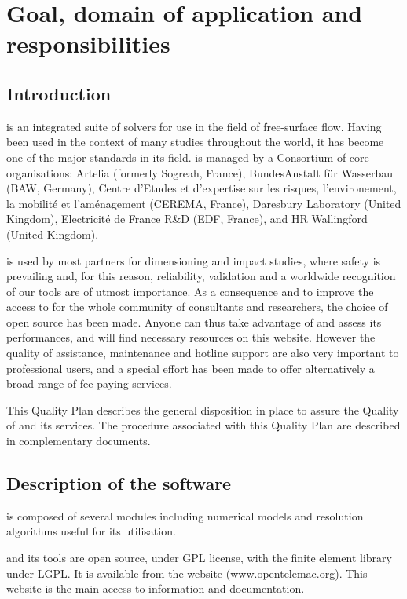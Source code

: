 \chapter{Goal, domain of application and responsibilities}

\section{Introduction}

\telemacsystem is an integrated suite of solvers for use in the field of free-surface
flow. Having been used in the context of many studies throughout the world, it
has become one of the major standards in its field.  \telemacsystem is managed by a
Consortium of core organisations: Artelia (formerly Sogreah, France),
BundesAnstalt für Wasserbau (BAW, Germany), Centre d’Etudes et d'expertise sur
les risques, l'environement, la mobilité et l'aménagement (CEREMA, France),
Daresbury Laboratory (United Kingdom), Electricité de France R\&D (EDF,
France), and HR Wallingford (United Kingdom).

\telemacsystem is used by most partners for dimensioning and impact studies,
where safety is prevailing and, for this reason, reliability, validation and a
worldwide recognition of our tools are of utmost importance. As a consequence
and to improve the access to \telemacsystem for the whole community of
consultants and researchers, the choice of open source has been made. Anyone
can thus take advantage of \telemacsystem and assess its performances, and
will find necessary resources on this website. However the quality of
assistance, maintenance and hotline support are also very important to
professional users, and a special effort has been made to offer alternatively a
broad range of fee-paying services.

This Quality Plan describes the general disposition in place to assure the
Quality of \telemacsystem and its services. The procedure associated with this Quality
Plan are described in complementary documents.

\section{Description of the software}

\telemacsystem is composed of several modules including numerical models and resolution
algorithms useful for its utilisation.

\telemacsystem and its tools are open source, under GPL license, with the \bief finite
element library under LGPL. It is available from the \telemacsystem website
(\url{www.opentelemac.org}). This website is the main access to \telemacsystem
information and documentation.


